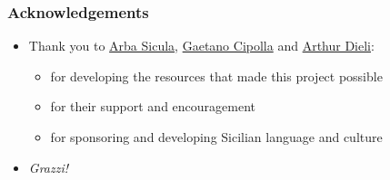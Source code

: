 \documentclass{beamer}
\begin{document}


\begin{frame}
  \frametitle{Acknowledgements}
  \vspace{-1.0em}
  \begin{itemize}
  \item Thank you to \href{https://www.arbasicula.org/}{Arba Sicula}, 
    \href{https://en.wikipedia.org/wiki/Gaetano_Cipolla}{Gaetano Cipolla} and 
    \href{http://www.dieli.net/}{Arthur Dieli}:
    \vspace{0.20em}
    \begin{itemize}
    \item for developing the resources that made this project possible
      \vspace{0.20em}
    \item for their support and encouragement
      \vspace{0.20em}
    \item for sponsoring and developing Sicilian language and culture
    \end{itemize}
    \vspace{0.35em}
  \item \textit{Grazzi!}
  \end{itemize} 
\end{frame}

\end{document}
